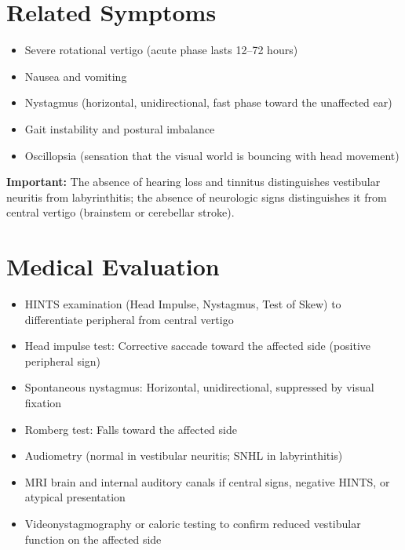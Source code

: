 \section*{Related Symptoms}
\begin{itemize}
  \item Severe rotational vertigo (acute phase lasts 12--72 hours)
  \item Nausea and vomiting
  \item Nystagmus (horizontal, unidirectional, fast phase toward the unaffected ear)
  \item Gait instability and postural imbalance
  \item Oscillopsia (sensation that the visual world is bouncing with head movement)
\end{itemize}
\textbf{Important:} The absence of hearing loss and tinnitus distinguishes vestibular neuritis from labyrinthitis; the absence of neurologic signs distinguishes it from central vertigo (brainstem or cerebellar stroke).

\section*{Medical Evaluation}
\begin{itemize}
  \item HINTS examination (Head Impulse, Nystagmus, Test of Skew) to differentiate peripheral from central vertigo
  \item Head impulse test: Corrective saccade toward the affected side (positive peripheral sign)
  \item Spontaneous nystagmus: Horizontal, unidirectional, suppressed by visual fixation
  \item Romberg test: Falls toward the affected side
  \item Audiometry (normal in vestibular neuritis; SNHL in labyrinthitis)
  \item MRI brain and internal auditory canals if central signs, negative HINTS, or atypical presentation
  \item Videonystagmography or caloric testing to confirm reduced vestibular function on the affected side
\end{itemize}

